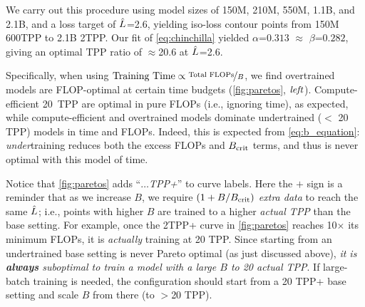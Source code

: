 We carry out this procedure using model sizes of 150M, 210M, 550M,
1.1B, and 2.1B, and a loss target of $\hat{L}$=2.6, yielding iso-loss
contour points from 150M 600TPP to 2.1B 2TPP.  Our fit of
\cref{eq:chinchilla} yielded $\alpha$=$0.313$ $\approx$
$\beta$=$0.282$, giving an optimal TPP ratio of $\approx$20.6 at
$\hat{L}$=2.6.




Specifically, when using $\text{Training Time} \propto \nicefrac{\text{Total $\text{FLOPs}$}}{B}$,
we find overtrained models are FLOP-optimal at certain time budgets
(\cref{fig:paretos}, $\text{\emph{left}}$).  Compute-efficient 20~TPP are
optimal in pure FLOPs (i.e., ignoring time), as expected, while
compute-efficient and overtrained models dominate undertrained ($<$ 20
TPP) models in time and FLOPs.  Indeed, this is expected from
\cref{eq:b_equation}: \emph{under}training reduces both the excess
FLOPs and $B_{\text{crit}}$ terms, and thus is never optimal with this model of
time.
%



Notice that \cref{fig:paretos} adds ``\emph{$\ldots$TPP+}'' to curve
labels.  Here the $+$ sign is a reminder that as we increase $B$, we
require $(1 + {B}/{B_{\text{crit}}})$ \emph{extra data} to reach the
same $\hat{L}$; i.e., points with higher $B$ are trained to a higher
\emph{actual TPP} than the base setting.
For example, once the 2TPP+ curve in \cref{fig:paretos} reaches
10$\times$ its minimum FLOPs, it is \emph{actually} training at 20
TPP\@.
%
Since starting from an undertrained base setting is never Pareto
optimal (as just discussed above), \emph{it is \textbf{always}
suboptimal to train a model with a large $B$ to 20 actual TPP}.  If
large-batch training is needed, the configuration should start from a
20 TPP+ base setting and scale $B$ from there (to $>$20 TPP).

